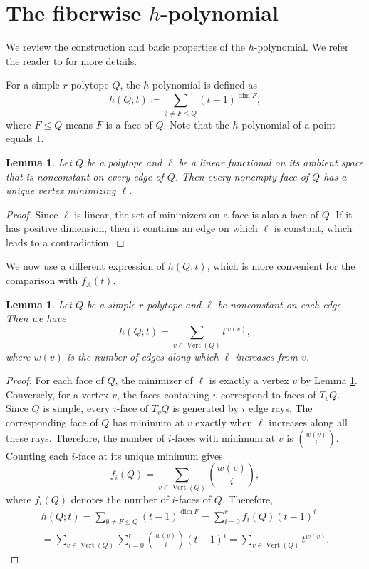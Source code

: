 \documentclass[12pt]{amsart}
\newtheorem{lemma}[theorem]{Lemma}
\numberwithin{equation}{section}
\numberwithin{theorem}{section}
\newcommand{\op}{\operatorname}
\begin{document}
\section{The fiberwise \texorpdfstring{$h$}{h}-polynomial}
\label{sec-fiber-h}

We review the construction and basic properties of the $h$-polynomial. We refer the reader to \cite[Chapter~8]{Zie} for more details.

For a simple $r$-polytope $Q$, the $h$-polynomial is defined as
\begin{equation}
  h(Q;t)\coloneqq \sum_{\emptyset\neq F\leq Q}(t-1)^{\op{dim}F},
\end{equation}
where $F\leq Q$ means $F$ is a face of $Q$. Note that the $h$-polynomial of a point equals $1$. 

\begin{lemma}
  \label{lemma-minimizer}
  Let $Q$ be a polytope and $\ell$ be a linear functional on its ambient space that is nonconstant on every edge of $Q$. Then every nonempty face of $Q$ has a unique vertex minimizing $\ell$.
\end{lemma}
\begin{proof}
  Since $\ell$ is linear, the set of minimizers on a face is also a face of $Q$. If it has positive dimension, then it contains an edge on which $\ell$ is constant, which leads to a contradiction.
\end{proof}

We now use a different expression of $h(Q;t)$, which is more convenient for the comparison with $f_A(t)$.

\begin{lemma}
  \label{lemma-h}
  Let $Q$ be a simple $r$-polytope and $\ell$ be nonconstant on each edge. Then we have
  \begin{equation}
    h(Q;t)=\sum_{v\in \op{Vert}(Q)}t^{w(v)},
  \end{equation}
  where $w(v)$ is the number of edges along which $\ell$ increases from $v$.
\end{lemma}
\begin{proof}
  For each face of $Q$, the minimizer of $\ell$ is exactly a vertex $v$ by Lemma \ref{lemma-minimizer}. 
  Conversely, for a vertex $v$, the faces containing $v$ correspond to faces of $T_vQ$. Since $Q$ is simple, every $i$-face of $T_vQ$ is generated by $i$ edge rays. The corresponding face of $Q$ has minimum at $v$ exactly when $\ell$ increases along all these rays. Therefore, the number of $i$-faces with minimum at $v$ is $\binom{w(v)}{i}$. Counting each $i$-face at its unique minimum gives
  \begin{equation}
    f_i(Q)=\sum_{v\in \op{Vert}(Q)}\binom{w(v)}{i},
  \end{equation}
  where $f_i(Q)$ denotes the number of $i$-faces of $Q$. Therefore,
  \begin{gather*}
    h(Q;t)=\sum_{\emptyset\neq F\leq Q}(t-1)^{\op{dim}F}=\sum_{i=0}^r f_i(Q)(t-1)^i\\ 
    =\sum_{v\in \op{Vert}(Q)}\sum_{i=0}^r \binom{w(v)}{i}(t-1)^i=\sum_{v\in \op{Vert}(Q)} t^{w(v)}.
  \end{gather*}
\end{proof}
\end{document}
